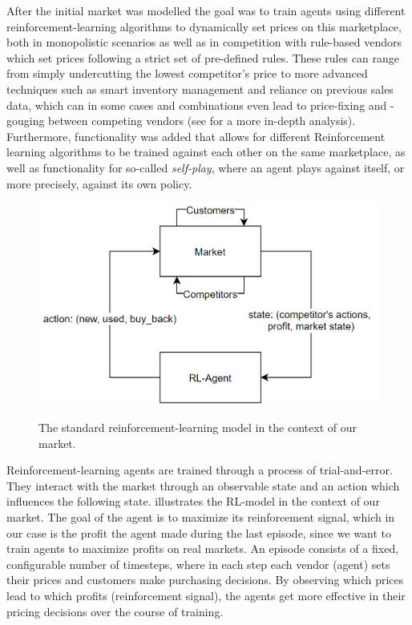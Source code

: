 After the initial market was modelled the goal was to train agents using different reinforcement-learning algorithms to dynamically set prices on this marketplace, both in monopolistic scenarios as well as in competition with rule-based vendors which set prices following a strict set of pre-defined rules. These rules can range from simply undercutting the lowest competitor's price to more advanced techniques such as smart inventory management and reliance on previous sales data, which can in some cases and combinations even lead to price-fixing and -gouging between competing vendors (see  for a more in-depth analysis). Furthermore, functionality was added that allows for different Reinforcement learning algorithms to be trained against each other on the same marketplace, as well as functionality for so-called \emph{self-play}, where an agent plays against itself, or more precisely, against its own policy.

\begin{figure}
	\centering
	\includegraphics[height = 7 cm]{images/RL-Overview.png}\\[1 ex]
	\caption{The standard reinforcement-learning model in the context of our market.}\label{fig:IntroRLDiagram}
\end{figure}

Reinforcement-learning agents are trained through a process of trial-and-error. They interact with the market through an observable state and an action which influences the following state.  illustrates the RL-model in the context of our market. The goal of the agent is to maximize its reinforcement signal, which in our case is the profit the agent made during the last episode, since we want to train agents to maximize profits on real markets. An episode consists of a fixed, configurable number of timesteps, where in each step each vendor (agent) sets their prices and customers make purchasing decisions. By observing which prices lead to which profits (reinforcement signal), the agents get more effective in their pricing decisions over the course of training.